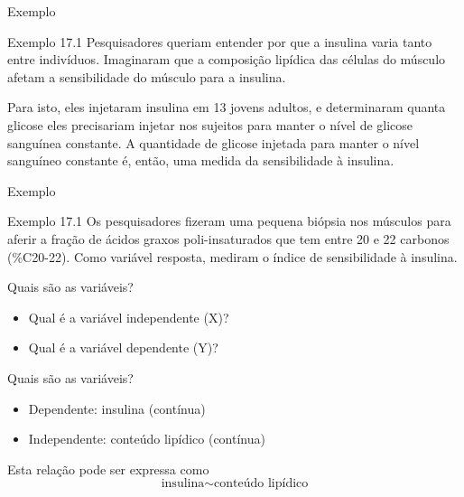 \documentclass{beamer}
\begin{document}
\begin{frame}{\scriptsize Exemplo}
  \begin{exampleblock}{Exemplo 17.1}
    \scriptsize
   Pesquisadores queriam entender por que a insulina varia tanto entre
   indivíduos. Imaginaram que a \alert<2>{composição lipídica} das células do
   músculo afetam a \alert<3>{sensibilidade do músculo para a insulina}.

   \bigskip
   Para isto, eles injetaram insulina em 13 jovens adultos, e
   determinaram quanta glicose eles precisariam injetar nos sujeitos
   para manter o nível de glicose sanguínea constante. A quantidade de
   glicose injetada para manter o nível sanguíneo constante é, então,
   uma medida da sensibilidade à insulina.

  \end{exampleblock}
\end{frame}

\begin{frame}{\scriptsize Exemplo}
  \begin{exampleblock}{Exemplo 17.1}
    \footnotesize
    Os pesquisadores fizeram uma pequena biópsia nos músculos para
    aferir a fração de ácidos graxos poli-insaturados que tem entre 20
    e 22 carbonos (\%C20-22). Como variável resposta, mediram o índice
    de sensibilidade à insulina.
  \end{exampleblock}
  \vfill
  \begin{block}{Quais são as variáveis?}
    \footnotesize
    \begin{itemize}
      \footnotesize
    \item Qual é a variável independente (X)? %
    \item Qual é a variável dependente (Y)? %
    \end{itemize}
  \end{block}
\end{frame}

\begin{frame}{\scriptsize Quais são as variáveis?}
  \begin{itemize}
    \footnotesize
  \item Dependente: insulina (contínua)
  \item Independente: conteúdo lipídico (contínua)
  \end{itemize}
  \vfill
  \begin{block}{Esta relação pode ser expressa como}
    \footnotesize
    \begin{displaymath}
      \text{insulina} \sim \text{conteúdo lipídico}
    \end{displaymath}
  \end{block}
\end{frame}
\end{document}
